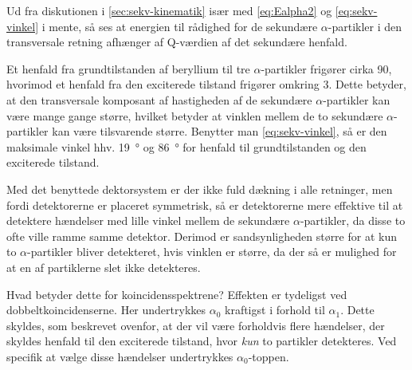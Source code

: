 Ud fra diskutionen i \cref{sec:sekv-kinematik} især med \cref{eq:Ealpha2} og \cref{eq:sekv-vinkel}
i mente, så ses at energien til rådighed for de sekundære $\alpha$-partikler i den transversale retning
afhænger af Q-værdien af det sekundære henfald.

Et henfald fra grundtilstanden af beryllium til tre $\alpha$-partikler frigører cirka 90\keV, hvorimod et
henfald fra den exciterede tilstand frigører omkring 3\MeV. Dette betyder, at den transversale
komposant af hastigheden af de sekundære $\alpha$-partikler kan være mange gange større, hvilket betyder
at vinklen mellem de to sekundære $\alpha$-partikler kan være tilsvarende større. Benytter man
\cref{eq:sekv-vinkel}, så er den maksimale vinkel hhv. \SI{19}{\degree} og \SI{86}{\degree} for
henfald til grundtilstanden og den exciterede tilstand.

Med det benyttede dektorsystem er der ikke fuld dækning i alle retninger, men fordi detektorerne er
placeret symmetrisk, så er detektorerne mere effektive til at detektere hændelser med lille vinkel
mellem de sekundære $\alpha$-partikler, da disse to ofte ville ramme samme detektor. Derimod er sandsynligheden
større for at kun to $\alpha$-partikler bliver detekteret, hvis vinklen er større, da der så er mulighed
for at en af partiklerne slet ikke detekteres.

Hvad betyder dette for koincidensspektrene? Effekten er tydeligst ved dobbeltkoincidenserne. Her
undertrykkes $\alpha_{0}$ kraftigst i forhold til $\alpha_{1}$. Dette skyldes, som beskrevet ovenfor, at der
vil være forholdvis flere hændelser, der skyldes henfald til den exciterede tilstand, hvor \emph{kun} to
partikler detekteres. Ved specifik at vælge disse hændelser undertrykkes $\alpha_{0}$-toppen.

